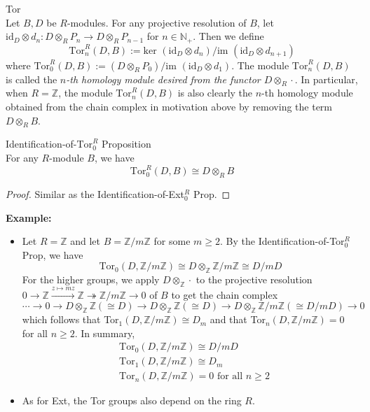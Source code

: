 \begin{definition}{Tor}\\
Let $B,D$ be $R$-modules. For any projective resolution of $B$, let $\text{id}_D \otimes d_n: D\otimes_R P_n \to D\otimes _RP_{n-1}$ for $n\in \mathbb{N}_+$. Then we define
\[
\text{Tor}_n^R (D,B):= \text{ker }(\text{id}_D \otimes d_n)/ \text{im } (\text{id}_D \otimes d_{n+1})
\]
where $\text{Tor}_0^R (D,B):= (D \otimes _RP_0)/ \text{im }(\text{id}_D \otimes d_1)$. The module $\text{Tor}_n^R (D,B)$ is called the \textit{$n$-th homology module desired from the functor $D \otimes_R \cdot$}. In particular, when $R=\mathbb{Z}$, the module $\text{Tor}_n^R (D,B)$ is also clearly the $n$-th homology module obtained from the chain complex in motivation above by removing the term $D\otimes _RB$.
\end{definition}


\begin{proposition}{Identification-of-$\text{Tor}_0^R$ Proposition}\\
For any $R$-module $B$, we have
\[
\text{Tor}_0^R (D,B) \cong D\otimes_RB
\]
\end{proposition}

\begin{proof}
    Similar as the Identification-of-Ext$^R_0$ Prop.
\end{proof}

\noindent\textbf{Example:} \begin{itemize}
    \item Let $R=\mathbb{Z}$ and let $B=\mathbb{Z}/ m\mathbb{Z}$ for some $m\geq 2$. By the Identification-of-Tor$^R_0$ Prop, we have
    \[
    \text{Tor}_0 (D,\mathbb{Z}/m\mathbb{Z}) \cong D\otimes_\mathbb{Z} \mathbb{Z}/m\mathbb{Z} \cong D/mD
    \]
    For the higher groups, we apply $D\otimes_\mathbb{Z} \cdot$ to the projective resolution $0\to \mathbb{Z} \xrightarrow{z \mapsto mz} \mathbb{Z} \twoheadrightarrow \mathbb{Z}/ m\mathbb{Z} \to 0$ of $B$ to get the chain complex
    \[
    \cdots\to 0\to D\otimes_\mathbb{Z} \mathbb{Z} (\cong D) \to D\otimes_\mathbb{Z} \mathbb{Z} (\cong D) \to D\otimes_\mathbb{Z} \mathbb{Z}/m\mathbb{Z} (\cong D/mD) \to0
    \]
    which follows that Tor$_1 (D,\mathbb{Z}/ m\mathbb{Z}) \cong D_m$ and that Tor$_n (D,\mathbb{Z}/ m\mathbb{Z})=0$ for all $n\geq 2$. In summary,
    \begin{align*}
        &\text{Tor}_0 (D,\mathbb{Z}/ m\mathbb{Z}) \cong D/mD\\
        &\text{Tor}_1 (D,\mathbb{Z}/ m\mathbb{Z}) \cong D_m\\
        &\text{Tor}_n (D,\mathbb{Z}/ m\mathbb{Z})=0 \text{ for all }n\geq 2
    \end{align*}

    \item As for Ext, the Tor groups also depend on the ring $R$.
\end{itemize}



